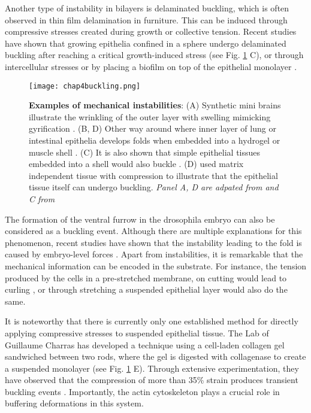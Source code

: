Another type of instability in bilayers is delaminated buckling, which is often observed in thin film delamination in furniture. This can be induced through compressive stresses created during growth or collective tension. Recent studies have shown that growing epithelia confined in a sphere undergo delaminated buckling after reaching a critical growth-induced stress \cite{trushko2020} (see Fig. \ref{fig_4_6} C), or through intercellular stresses \cite{oyama2021} or by placing a biofilm on top of the epithelial monolayer \cite{cont2020}.

\begin{figure}
	\centering
	\texttt{[image: chap4buckling.png]}
	\caption{\label{fig_4_6} \textbf{Examples of mechanical instabilities}: (A) Synthetic mini brains illustrate the wrinkling of the outer layer with swelling mimicking gyrification \cite{tallinen2016}. (B, D) Other way around where inner layer of lung or intestinal epithelia develops folds when embedded into a hydrogel or muscle shell \cite{varner2015, shyer2013}. (C) It is also shown that simple epithelial tissues embedded into a shell would also buckle \cite{trushko2020}. (D) \cite{wyatt2020} used matrix independent tissue with compression to illustrate that the epithelial tissue itself can undergo buckling. \textit{Panel A, D are adpated from \cite{collinet2021} and C from \cite{matejcic2020}}
	}
\end{figure}

The formation of the ventral furrow in the drosophila embryo can also be considered as a buckling event. Although there are multiple explanations for this phenomenon, recent studies have shown that the instability leading to the fold is caused by embryo-level forces \cite{guo2022, fierling2022}. Apart from instabilities, it is remarkable that the mechanical information can be encoded in the substrate. For instance, the tension produced by the cells in a pre-stretched membrane, on cutting would lead to curling \cite{tomba2022}, or through stretching a suspended epithelial layer would also do the same\cite{fouchard2020}.

It is noteworthy that there is currently only one established method for directly applying compressive stresses to suspended epithelial tissue. The Lab of Guillaume Charras has developed a technique using a cell-laden collagen gel sandwiched between two rods, where the gel is digested with collagenase to create a suspended monolayer (see Fig. \ref{fig_4_6} E). Through extensive experimentation, they have observed that the compression of more than 35\% strain produces transient buckling events \cite{wyatt2020}. Importantly, the actin cytoskeleton plays a crucial role in buffering deformations in this system.

